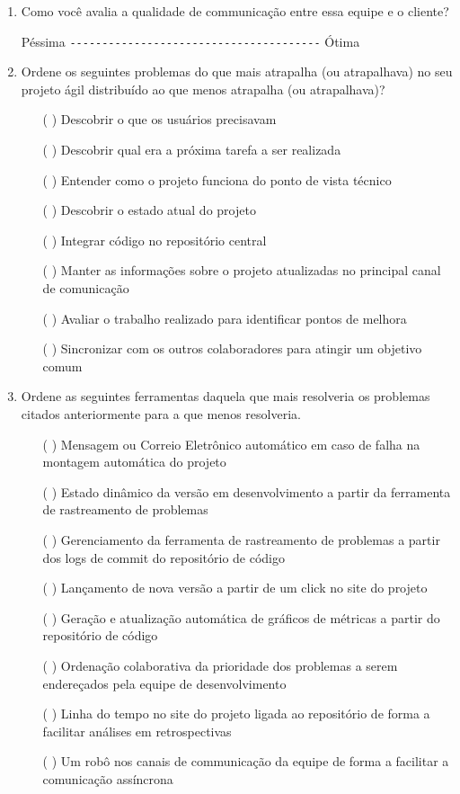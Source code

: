 \begin{enumerate}
\item Como você avalia a qualidade de communicação entre essa equipe e
  o cliente?

  Péssima \verb=---------------------------------------= Ótima

\item Ordene os seguintes problemas do que mais atrapalha (ou
  atrapalhava) no seu projeto ágil distribuído ao que menos atrapalha
  (ou atrapalhava)?
  \begin{itemize}
  \item[( )] Descobrir o que os usuários precisavam
  \item[( )] Descobrir qual era a próxima tarefa a ser realizada
  \item[( )] Entender como o projeto funciona do ponto de vista
    técnico
  \item[( )] Descobrir o estado atual do projeto
  \item[( )] Integrar código no repositório central
  \item[( )] Manter as informações sobre o projeto atualizadas no
    principal canal de comunicação
  \item[( )] Avaliar o trabalho realizado para identificar pontos de
    melhora
  \item[( )] Sincronizar com os outros colaboradores para atingir um
    objetivo comum
  \end{itemize}

\item Ordene as seguintes ferramentas daquela que mais resolveria os
  problemas citados anteriormente para a que menos resolveria.
  \begin{itemize}
  \item[( )] Mensagem ou Correio Eletrônico automático em caso de
    falha na montagem automática do projeto
  \item[( )] Estado dinâmico da versão em desenvolvimento a partir da
    ferramenta de rastreamento de problemas
  \item[( )] Gerenciamento da ferramenta de rastreamento de problemas
    a partir dos logs de commit do repositório de código
  \item[( )] Lançamento de nova versão a partir de um click no site do
    projeto
  \item[( )] Geração e atualização automática de gráficos de métricas
    a partir do repositório de código
  \item[( )] Ordenação colaborativa da prioridade dos problemas a
    serem endereçados pela equipe de desenvolvimento
  \item[( )] Linha do tempo no site do projeto ligada ao repositório
    de forma a facilitar análises em retrospectivas
  \item[( )] Um robô nos canais de communicação da equipe de forma a
    facilitar a comunicação assíncrona
  \end{itemize}


\end{enumerate}
